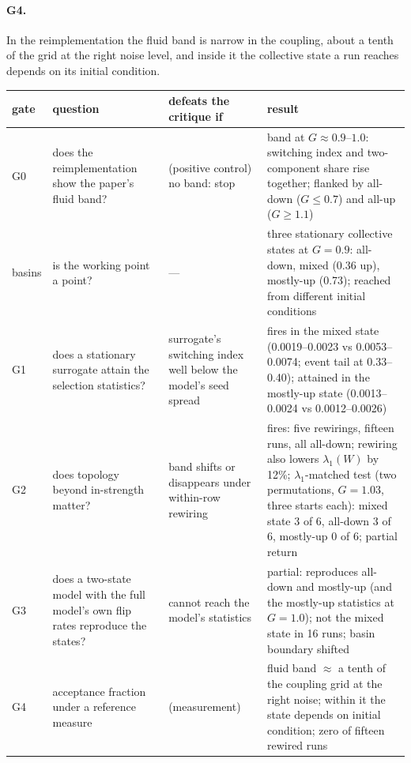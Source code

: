 \documentclass[11pt]{article}
\theoremstyle{definition}\newtheorem{observation}{Observation}
\theoremstyle{remark}\newtheorem{remark}{Remark}
\begin{document}
\paragraph{G4.} In the reimplementation the fluid band is narrow in the coupling, about a tenth of the grid at the right noise level, and inside it the collective state a run reaches depends on its initial condition.
\begin{center}\small
\begin{tabular}{@{}p{1.6cm}p{4.3cm}p{3.5cm}p{3.9cm}@{}}
\toprule
gate & question & defeats the critique if & result \\
\midrule
G0 & does the reimplementation show the paper's fluid band? & (positive control) no band: stop & band at $G\approx0.9$--$1.0$: switching index and two-component share rise together; flanked by all-down ($G\le0.7$) and all-up ($G\ge1.1$) \\
basins & is the working point a point? & --- & three stationary collective states at $G=0.9$: all-down, mixed (0.36 up), mostly-up (0.73); reached from different initial conditions \\
G1 & does a stationary surrogate attain the selection statistics? & surrogate's switching index well below the model's seed spread & fires in the mixed state (0.0019--0.0023 vs 0.0053--0.0074; event tail at 0.33--0.40); attained in the mostly-up state (0.0013--0.0024 vs 0.0012--0.0026) \\
G2 & does topology beyond in-strength matter? & band shifts or disappears under within-row rewiring & fires: five rewirings, fifteen runs, all all-down; rewiring also lowers $\lambda_1(W)$ by 12\%; $\lambda_1$-matched test (two permutations, $G=1.03$, three starts each): mixed state 3 of 6, all-down 3 of 6, mostly-up 0 of 6; partial return \\
G3 & does a two-state model with the full model's own flip rates reproduce the states? & cannot reach the model's statistics & partial: reproduces all-down and mostly-up (and the mostly-up statistics at $G=1.0$); not the mixed state in 16 runs; basin boundary shifted \\
G4 & acceptance fraction under a reference measure & (measurement) & fluid band $\approx$ a tenth of the coupling grid at the right noise; within it the state depends on initial condition; zero of fifteen rewired runs \\
\bottomrule
\end{tabular}
\end{center}

\printbibliography
\end{document}
